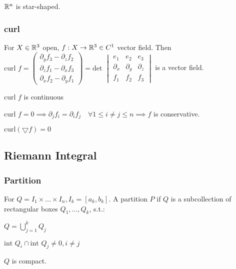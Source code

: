 \begin{compactitem}
    \item $\mathbb{R}^n$ is star-shaped.
\end{compactitem}

\subsubsection{curl}
For $X \in \mathbb{R}^3$ open, $f: X \to \mathbb{R}^3 \in C^1$ vector field. Then $\text{curl } f =
\begin{pmatrix}
    \partial_y f_3 - \partial_z f_2\\
    \partial_z f_1 - \partial_x f_3\\
    \partial_x f_2 - \partial_y f_1
\end{pmatrix} = \text{det }
\begin{vmatrix}
    e_1 & e_2 & e_3\\
    \partial_x & \partial_y & \partial_z\\
    f_1 & f_2 & f_3
\end{vmatrix}$ is a vector field.

\begin{compactitem}
    \item $\text{curl } f$ is continuous
    \item $\text{curl } f = 0 \implies \partial_j f_i = \partial_i f_j \quad \forall 1 \le i \neq j \le n \implies f$ is conservative.
    \item $\text{curl}(\bigtriangledown f) = 0$

\end{compactitem}

\subsection{Riemann Integral}

\subsubsection{Partition}
For $Q = I_1 \times \dots \times I_n, I_k = [a_k, b_k]$. A partition $P$ if $Q$ is a subcollection of rectangular boxes $Q_1, \dots , Q_k$, s.t.:
\begin{inparaitem}
    \item $Q = \bigcup_{j = 1}^k Q_j$
    \item $\text{int } Q_i \cap \text{int }Q_j \neq 0, i \neq j$
\end{inparaitem}

\begin{compactitem}
    \item $Q$ is compact.
\end{compactitem}

